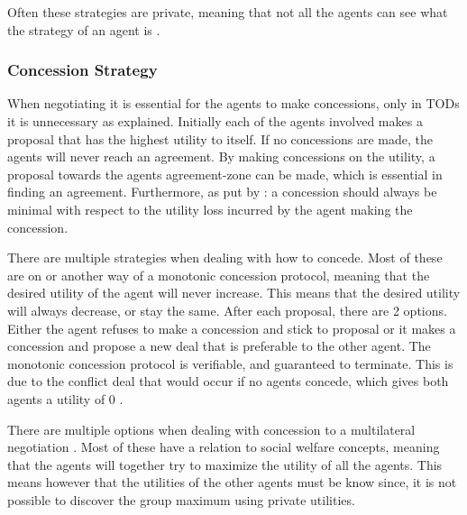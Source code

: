 Often these strategies are private, meaning that not all the agents can see what the strategy of an agent is \citep{fatima2004agenda}. 

\subsubsection{Concession Strategy}
\label{sec:concessionstrat}
When negotiating it is essential for the agents to make concessions, only in TODs it is unnecessary as explained. Initially each of the agents involved makes a proposal that has the highest utility to itself. If no concessions are made, the agents will never reach an agreement. By making concessions on the utility, a proposal towards the agents agreement-zone can be made, which is essential in finding an agreement. Furthermore, as put by \citet{endriss2006monotonic}: a concession should always be minimal with respect to the utility loss incurred by the agent making the concession.

There are multiple strategies when dealing with how to concede. Most of these are on or another way of a monotonic concession protocol, meaning that the desired utility of the agent will never increase. This means that the desired utility will always decrease, or stay the same. After each proposal, there are 2 options. Either the agent refuses to make a concession and stick to proposal or it makes a concession and propose a new deal that is preferable to the other agent. The monotonic concession protocol is verifiable, and guaranteed to terminate. This is due to the conflict deal that would occur if no agents concede, which gives both agents a utility of 0 \cite{endriss2006monotonic}.


There are multiple options when dealing with concession to a multilateral negotiation \citep{endriss2006monotonic}. Most of these have a relation to social welfare concepts, meaning that the agents will together try to maximize the utility of all the agents. This means however that the utilities of the other agents must be know since, it is not possible to discover the group maximum using private utilities.

